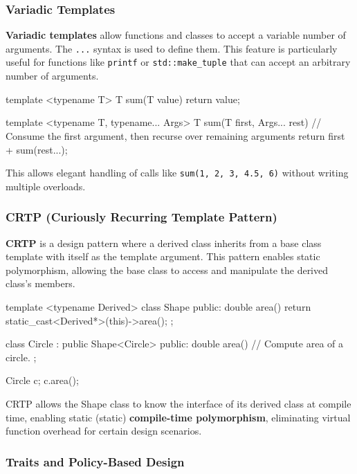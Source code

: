 \subsubsection{Variadic Templates}

\textbf{Variadic templates} allow functions and classes to accept a variable number of arguments. The \texttt{...} syntax is used to define them. This feature is particularly useful for functions like \texttt{printf} or \texttt{std::make\_tuple} that can accept an arbitrary number of arguments.

\begin{codeblock}[language=C++, numbers=none]
template <typename T>
T sum(T value) {
    return value;
}

template <typename T, typename... Args>
T sum(T first, Args... rest) {
    // Consume the first argument, then recurse over remaining arguments
    return first + sum(rest...);
}
\end{codeblock}

This allows elegant handling of calls like \texttt{sum(1, 2, 3, 4.5, 6)} without writing multiple overloads.

\newpage

\subsubsection{CRTP (Curiously Recurring Template Pattern)}

\textbf{CRTP} is a design pattern where a derived class inherits from a base class template with itself as the template argument. This pattern enables static polymorphism, allowing the base class to access and manipulate the derived class's members.

\begin{codeblock}[language=C++, numbers=none]
template <typename Derived>
class Shape {
public:
    double area() {
        return static_cast<Derived*>(this)->area();
    }
};

class Circle : public Shape<Circle> {
public:
    double area() {
        // Compute area of a circle.
    }
};

Circle c;
c.area();
\end{codeblock}

CRTP allows the Shape class to know the interface of its derived class at compile time, enabling static (static) \textbf{compile-time polymorphism}, eliminating virtual function overhead for certain design scenarios.

\subsubsection{Traits and Policy-Based Design}

